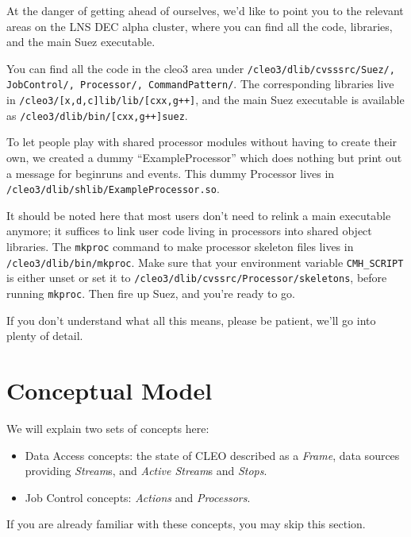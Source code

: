 \documentclass[12pt]{article}
\begin{document}
At the danger of getting ahead of ourselves, we'd like to point you to
the relevant areas on the LNS DEC alpha cluster, where you can find all
the code, libraries, and the main Suez executable.

You can find all the code in the cleo3 area under
\texttt{/cleo3/dlib/cvsssrc/Suez/, JobControl/, Processor/,
CommandPattern/}. The corresponding libraries live in
\texttt{/cleo3/[x,d,c]lib/lib/[cxx,g++]}, and the main Suez executable is available as
\texttt{/cleo3/dlib/bin/[cxx,g++]suez}.

To let people play with shared processor modules without having to
create their own, we created a dummy ``ExampleProcessor'' which does
nothing but print out a message for beginruns and events. This dummy
Processor lives in \texttt{/cleo3/dlib/shlib/ExampleProcessor.so}.  

It should be noted here that most users don't need to relink a main
executable anymore; it suffices to link user code living in processors
into shared object libraries.  The \texttt{mkproc} command to make
processor skeleton files lives in \texttt{/cleo3/dlib/bin/mkproc}. Make
sure that your environment variable \texttt{CMH\_SCRIPT} is either unset
or set it to \texttt{/cleo3/dlib/cvssrc/Processor/skeletons}, before
running \texttt{mkproc}. Then fire up Suez, and you're ready to go.

If you don't understand what all this means, please be patient, we'll go
into plenty of detail.


\section{Conceptual Model }
\label{sec:ConceptualModel}

We will explain two sets of concepts here: 
\begin{itemize}
\item Data Access concepts: the
state of CLEO described as a \emph{Frame}, data sources
providing \emph{Stream}s, and \emph{Active
Stream}s and \emph{Stops}.

\item Job Control concepts: \emph{Actions} and
\emph{Processors}. 

\end{itemize}
If you are already familiar with these concepts, you may skip this section.
\end{document}
